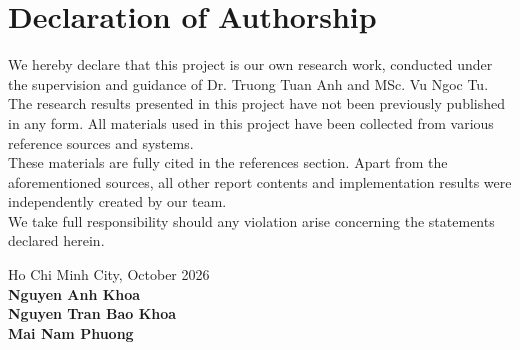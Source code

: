 \section*{Declaration of Authorship}
\thispagestyle{empty}

We hereby declare that this project is our own research work, conducted under the supervision and guidance of Dr. Truong Tuan Anh and MSc. Vu Ngoc Tu. The research results presented in this project have not been previously published in any form. All materials used in this project have been collected from various reference sources and systems.\\
These materials are fully cited in the references section. Apart from the aforementioned sources, all other report contents and implementation results were independently created by our team.\\
We take full responsibility should any violation arise concerning the statements declared herein.\\

\begin{flushright}
    Ho Chi Minh City, October 2026 \\
    \textbf{Nguyen Anh Khoa} \\
    \textbf{Nguyen Tran Bao Khoa} \\
    \textbf{Mai Nam Phuong} \\
\end{flushright}


\clearpage
{}

